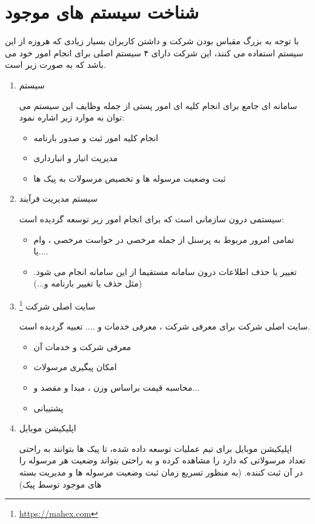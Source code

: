 \documentclass[12pt,a4paper]{report}
\begin{document}
\section{شناخت سیستم های موجود}
با توجه به بزرگ مقباس بودن شرکت و داشتن کاربران بسیار زیادی که هروزه از این سیستم استفاده می کنند، این شرکت دارای ۴ سیستم اصلی برای انجام امور خود می باشد که به صورت زیر است.
\begin{enumerate}
	\item سیستم 

سامانه ای جامع  برای انجام کلیه ای امور پستی از جمله وظایف این سیستم می توان به موارد زیر اشاره نمود:
\begin{itemize}
	\item انجام کلیه امور ثبت و صدور بارنامه 
	\item مدیریت انبار و انبارداری
	\item ثبت وضعیت مرسوله ها و تخصیص مرسولات به پیک ها
\end{itemize}
	\item سیستم مدیریت فرآیند
	
	سیستمی درون سازمانی است که برای انجام امور زیر توسعه گردیده است:
\begin{itemize}
\item  تمامی امرور مربوط به پرسنل از جمله مرخصی در خواست مرخصی ، وام یا....
\item تغییر یا حذف اطلاعات درون سامانه  مستقیما از این سامانه انجام می شود. (مثل حذف یا تغییر بارنامه و...)
\end{itemize}
	\item سایت اصلی شرکت \footnote{\url{https://mahex.com}}
	
سایت اصلی شرکت برای معرفی شرکت ، معرفی خدمات و .... تعبیه گردیده است.
\begin{itemize}
	\item معرفی شرکت و خدمات آن
	\item امکان پیگیری مرسولات  
	\item محاسبه قیمت  براساس وزن ، مبدا و مقصد و...
	\item پشتیبانی 
\end{itemize}
	\item اپلیکیشن موبایل

اپلیکیشن موبایل برای تیم عملیات توسعه داده شده، تا پیک ها بتوانند به راحتی تعداد مرسولاتی که دارد را مشاهده کرده و به راحتی بتواند وضعیت هر مرسوله را در آن ثبت کننده. (به منظور تسریع زمان ثبت وضعیت مرسوله ها و مدیریت بسته های موجود توسط پیک)
\end{enumerate}
\end{document}

